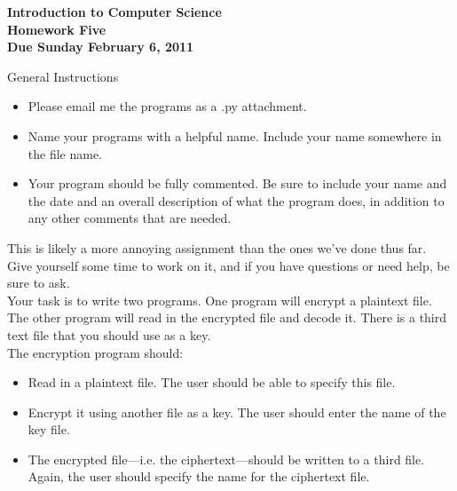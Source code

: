 \documentclass[12pt]{article}
\begin{document}
\pagestyle{empty}
 
\begin{center}
{\large {\bf Introduction to Computer Science}}\\
\medskip
{\large {\bf Homework Five}}\\
\medskip
{ {\bf Due Sunday February 6, 2011}}\\ 
\end{center}


\noindent General Instructions

\begin{itemize}
\setlength{\itemsep}{-1mm}
  \item Please email me the programs as a .py attachment.
  \item Name your programs with a helpful name.  Include your name
    somewhere in the file name.
  \item Your program should be fully commented.  Be sure to include
    your name and the date and an overall description of what the
    program does, in addition to any other comments that are needed. \\
\end{itemize}



\noindent This is likely a more annoying assignment than the ones
we've done thus far.  Give yourself some time to work on it, and if
you  have questions or need help, be sure to ask.\\

\noindent   Your task is to write two programs.  One program will
encrypt a plaintext file.  The other program will read in the
encrypted file and decode it.  There is a third text file that you
should use as a key. \\

\noindent   The encryption program should:

\begin{itemize}
    \item Read in a plaintext file.  The user should be able to
      specify this file.

    \item Encrypt it using another file as a key.  The user should
      enter the name of the key file.

    \item The encrypted file---i.e. the ciphertext---should be written
      to a third file.  Again, the user should specify the name for
      the ciphertext file.  

\end{itemize}
\end{document}
